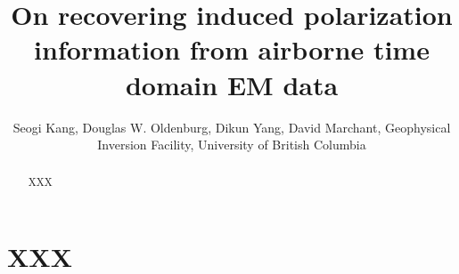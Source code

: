 \documentclass{segabs}
\begin{document}
\title{On recovering induced polarization information from airborne time domain EM data}

\renewcommand{\thefootnote}{\fnsymbol{footnote}}

\author{Seogi Kang\footnotemark[1], Douglas W. Oldenburg, Dikun Yang, David Marchant, Geophysical Inversion Facility, University of British Columbia}


\maketitle
\begin{abstract}
XXX
\end{abstract}
\renewcommand{\figdir}{Fig} %

\section{XXX}

\cite{Weidelt1982}
\cite{SmithandKlein}
\cite{Marchant2014}
\cite{Jansen2004}
\cite{Macnae2015}
\cite{Smith1988a}
\cite{Kang2016}
\cite{PowerHildes2007}


\end{document}
